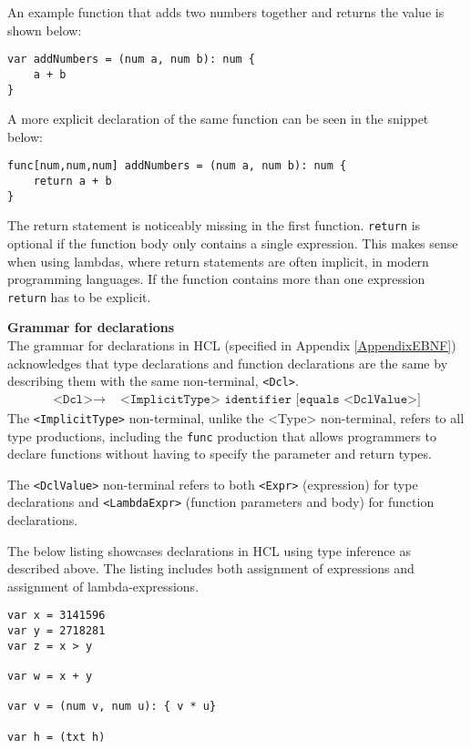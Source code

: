 An example function that adds two numbers together and returns the value is shown below:
\begin{lstlisting}[language=HCL,label=lis:addNumbers,firstnumber=1]
var addNumbers = (num a, num b): num {
    a + b
}
\end{lstlisting} 
A more explicit declaration of the same function can be seen in the snippet below:
\begin{lstlisting}[language=HCL,label=lis:hclExplicitTypeDcls,firstnumber=1]
func[num,num,num] addNumbers = (num a, num b): num {
	return a + b
}
\end{lstlisting}

The return statement is noticeably missing in the first function.
\texttt{return} is optional if the function body only contains a single expression. 
This makes sense when using lambdas, where return statements are often implicit, in modern programming languages. 
If the function contains more than one expression \texttt{return} has to be explicit.

\textbf{Grammar for declarations}\\
The grammar for declarations in HCL (specified in Appendix \ref{AppendixEBNF}) acknowledges that type declarations and function declarations are the same by describing them with the same non-terminal, \texttt{<Dcl>}.
\begin{align*}
	\texttt{<Dcl>}\to & \texttt{ <ImplicitType> identifier [equals <DclValue>]}
\end{align*}
The \texttt{<ImplicitType>} non-terminal, unlike the <Type> non-terminal, refers to all type productions, including the \texttt{func} production that allows programmers to declare functions without having to specify the parameter and return types.

The \texttt{<DclValue>} non-terminal refers to both \texttt{<Expr>} (expression) for type declarations and \texttt{<LambdaExpr>} (function parameters and body) for function declarations.

The below listing showcases declarations in HCL using type inference as described above.
The listing includes both assignment of expressions and assignment of lambda-expressions.

\begin{lstlisting}[language=HCL,caption={Implicit type declarations in HCL.
},firstnumber=1]
var x = 3141596
var y = 2718281
var z = x > y

var w = x + y

var v = (num v, num u): { v * u}

var h = (txt h)
\end{lstlisting}

